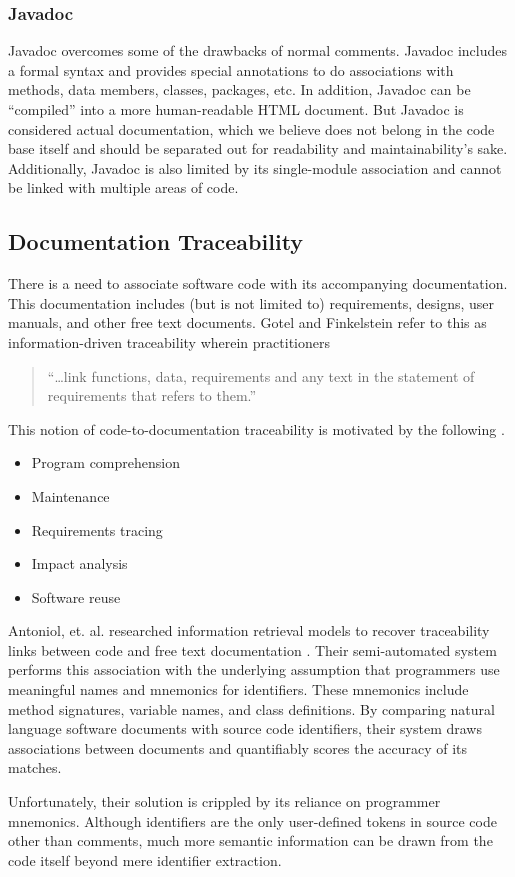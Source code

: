 \subsubsection*{Javadoc}
Javadoc overcomes some of the drawbacks of normal comments. Javadoc includes a
formal syntax and provides special annotations to do associations with methods,
data members, classes, packages, etc. In addition, Javadoc can be ``compiled''
into a more human-readable HTML document. But Javadoc is considered actual
documentation, which we believe does not belong in the code base itself and
should be separated out for readability and maintainability's sake.
Additionally, Javadoc is also limited by its single-module association and
cannot be linked with multiple areas of code.

\subsection{Documentation Traceability}
There is a need to associate software code with its accompanying documentation.
This documentation includes (but is not limited to) requirements, designs, user
manuals, and other free text documents. Gotel and Finkelstein refer to this as
information-driven traceability wherein practitioners
\begin{quote}
``\ldots link functions, data, requirements and any text in the statement of
requirements that refers to them.'' \cite{Gotel1994}
\end{quote}

This notion of code-to-documentation traceability is motivated by the following
\cite{Antoniol1999}.
\begin{itemize}
  \item Program comprehension
  \item Maintenance
  \item Requirements tracing
  \item Impact analysis
  \item Software reuse
\end{itemize}

Antoniol, et. al. researched information retrieval models to recover 
traceability links between code and free text documentation \cite{Antoniol1999,
Antoniol2000}. Their semi-automated system performs this association with the
underlying assumption that programmers use meaningful names and mnemonics for
identifiers. These mnemonics include method signatures, variable names, and
class definitions. By comparing natural language software documents with source
code identifiers, their system draws associations between documents and
quantifiably scores the accuracy of its matches.

Unfortunately, their solution is crippled by its reliance on programmer
mnemonics. Although identifiers are the only user-defined tokens in source
code other than comments, much more semantic information can be drawn from the 
code itself beyond mere identifier extraction.
